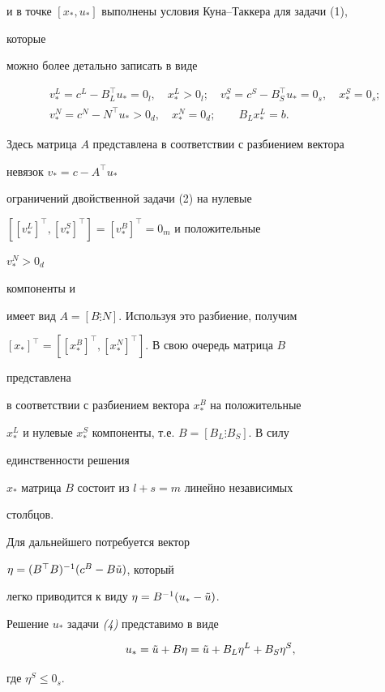 и в точке $[x_*,u_*]$ выполнены условия Куна--Таккера для задачи (1),


которые


можно более детально записать в виде


\begin{equation}


\begin{split}


& v^L_*=c^L-B^\top_Lu_*=0_l,\quad x^L_*>0_l;\quad


v^S_*=c^S-B^\top_Su_*=0_s,\quad x^S_*=0_s;\\


& v^N_*=c^N-N^\top u_*>0_d,\quad x^N_*=0_d; \qquad B_Lx^L_*=b.


\end{split}


\end{equation}


Здесь матрица $A$ представлена в соответствии с разбиением вектора


невязок $v_*=c-A^\top u_*$


ограничений двойственной задачи (2) на нулевые


$[[v^L_*]^\top,[v^S_*]^\top]=[v^B_*]^\top=0_m$ и положительные


$v^N_*>0_d$


компоненты и


имеет вид $A=[B\vdots N]$. Используя это разбиение, получим


$[x_*]^\top=[[x^B_*]^\top,[x^N_*]^\top]$. В свою очередь матрица $B$


представлена


в соответствии с разбиением вектора $x^B_*$ на положительные


$x^L_*$ и нулевые $x^S_*$ компоненты, т.е. $B=[B_L\vdots B_S]$. В силу


единственности решения


$x_*$ матрица $B$ состоит из $l+s=m$ линейно независимых


столбцов.





Для дальнейшего потребуется вектор


$\eta=(B^\top B)^{-1}(c^B-B\Tilde u)$, который


легко приводится к виду $\eta=B^{-1}(u_*-\Tilde u)$.





\begin{lemnonum} Решение $u_*$ задачи {\em (4)} представимо в виде


$$


u_*=\Tilde u+B\eta=\Tilde u+B_L\eta^L+B_S\eta^S,


$$


где $\eta^S\le 0_s$.


\end{lemnonum}





